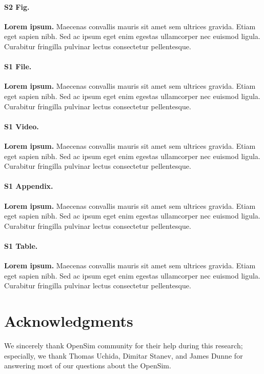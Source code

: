 \documentclass[10pt,letterpaper]{article}
\begin{document}
\paragraph*{S2 Fig.}
\label{S2_Fig}
{\bf Lorem ipsum.} Maecenas convallis mauris sit amet sem ultrices gravida. Etiam eget sapien nibh. Sed ac ipsum eget enim egestas ullamcorper nec euismod ligula. Curabitur fringilla pulvinar lectus consectetur pellentesque.

\paragraph*{S1 File.}
\label{S1_File}
{\bf Lorem ipsum.}  Maecenas convallis mauris sit amet sem ultrices gravida. Etiam eget sapien nibh. Sed ac ipsum eget enim egestas ullamcorper nec euismod ligula. Curabitur fringilla pulvinar lectus consectetur pellentesque.

\paragraph*{S1 Video.}
\label{S1_Video}
{\bf Lorem ipsum.}  Maecenas convallis mauris sit amet sem ultrices gravida. Etiam eget sapien nibh. Sed ac ipsum eget enim egestas ullamcorper nec euismod ligula. Curabitur fringilla pulvinar lectus consectetur pellentesque.

\paragraph*{S1 Appendix.}
\label{S1_Appendix}
{\bf Lorem ipsum.} Maecenas convallis mauris sit amet sem ultrices gravida. Etiam eget sapien nibh. Sed ac ipsum eget enim egestas ullamcorper nec euismod ligula. Curabitur fringilla pulvinar lectus consectetur pellentesque.

\paragraph*{S1 Table.}
\label{S1_Table}
{\bf Lorem ipsum.} Maecenas convallis mauris sit amet sem ultrices gravida. Etiam eget sapien nibh. Sed ac ipsum eget enim egestas ullamcorper nec euismod ligula. Curabitur fringilla pulvinar lectus consectetur pellentesque.

\section*{Acknowledgments}
We sincerely thank OpenSim community for their help during this research; especially, we thank Thomas Uchida, Dimitar Stanev, and James Dunne for answering most of our questions about the OpenSim.

\nolinenumbers

%
%
% 


\end{document}

